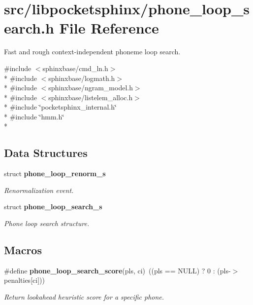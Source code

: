 \section{src/libpocketsphinx/phone\-\_\-loop\-\_\-search.h File Reference}
\label{phone__loop__search_8h}


Fast and rough context-\/independent phoneme loop search.  


{\ttfamily \#include $<$sphinxbase/cmd\-\_\-ln.\-h$>$}\\*
{\ttfamily \#include $<$sphinxbase/logmath.\-h$>$}\\*
{\ttfamily \#include $<$sphinxbase/ngram\-\_\-model.\-h$>$}\\*
{\ttfamily \#include $<$sphinxbase/listelem\-\_\-alloc.\-h$>$}\\*
{\ttfamily \#include \char`\"{}pocketsphinx\-\_\-internal.\-h\char`\"{}}\\*
{\ttfamily \#include \char`\"{}hmm.\-h\char`\"{}}\\*
\subsection*{Data Structures}
\begin{DoxyCompactItemize}
\item 
struct {\bf phone\-\_\-loop\-\_\-renorm\-\_\-s}
\begin{DoxyCompactList}\small\item\em Renormalization event. \end{DoxyCompactList}\item 
struct {\bf phone\-\_\-loop\-\_\-search\-\_\-s}
\begin{DoxyCompactList}\small\item\em Phone loop search structure. \end{DoxyCompactList}\end{DoxyCompactItemize}
\subsection*{Macros}
\begin{DoxyCompactItemize}
\item 
\#define {\bf phone\-\_\-loop\-\_\-search\-\_\-score}(pls, ci)~((pls == N\-U\-L\-L) ? 0 \-: (pls-\/$>$penalties[ci]))\label{phone__loop__search_8h_ab49609ce2ff4d1827f57693f463e360b}

\begin{DoxyCompactList}\small\item\em Return lookahead heuristic score for a specific phone. \end{DoxyCompactList}\end{DoxyCompactItemize}
